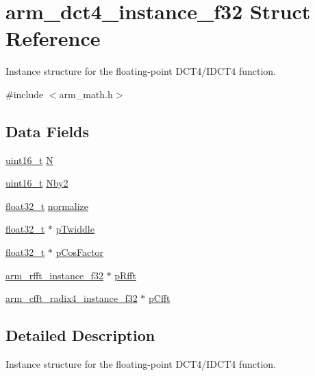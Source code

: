 \hypertarget{structarm__dct4__instance__f32}{\section{arm\-\_\-dct4\-\_\-instance\-\_\-f32 Struct Reference}
\label{structarm__dct4__instance__f32}
}


Instance structure for the floating-\/point D\-C\-T4/\-I\-D\-C\-T4 function.  




{\ttfamily \#include $<$arm\-\_\-math.\-h$>$}

\subsection*{Data Fields}
\begin{DoxyCompactItemize}
\item 
\hyperlink{stdint_8h_a273cf69d639a59973b6019625df33e30}{uint16\-\_\-t} \hyperlink{structarm__dct4__instance__f32_a262b29a51c371b46efc89120e31ccf37}{N}
\item 
\hyperlink{stdint_8h_a273cf69d639a59973b6019625df33e30}{uint16\-\_\-t} \hyperlink{structarm__dct4__instance__f32_adb1ef2739ddbe62e5cdadc47455a4147}{Nby2}
\item 
\hyperlink{arm__math_8h_a4611b605e45ab401f02cab15c5e38715}{float32\-\_\-t} \hyperlink{structarm__dct4__instance__f32_a61ce8c967b2e998a9c0041cca73cdef8}{normalize}
\item 
\hyperlink{arm__math_8h_a4611b605e45ab401f02cab15c5e38715}{float32\-\_\-t} $\ast$ \hyperlink{structarm__dct4__instance__f32_ad13544aafad268588c62e3eb35ae662c}{p\-Twiddle}
\item 
\hyperlink{arm__math_8h_a4611b605e45ab401f02cab15c5e38715}{float32\-\_\-t} $\ast$ \hyperlink{structarm__dct4__instance__f32_a6da1187e070801e011ce5e0582efa861}{p\-Cos\-Factor}
\item 
\hyperlink{structarm__rfft__instance__f32}{arm\-\_\-rfft\-\_\-instance\-\_\-f32} $\ast$ \hyperlink{structarm__dct4__instance__f32_a978f37fc19add31af243ab5c63ae502f}{p\-Rfft}
\item 
\hyperlink{structarm__cfft__radix4__instance__f32}{arm\-\_\-cfft\-\_\-radix4\-\_\-instance\-\_\-f32} $\ast$ \hyperlink{structarm__dct4__instance__f32_a018f7860b6e070af533fb7d76c7cdc32}{p\-Cfft}
\end{DoxyCompactItemize}


\subsection{Detailed Description}
Instance structure for the floating-\/point D\-C\-T4/\-I\-D\-C\-T4 function. 

